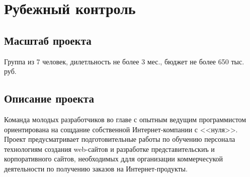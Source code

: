 \chapter{Рубежный контроль}

\section{Масштаб проекта}

Группа из 7 человек, дилетльность не более 3 мес., бюджет не более 650 тыс. руб.

\section{Описание проекта}

Команда молодых разработчиков во главе с опытным ведущим программистом ориентирована на сощдание собственной Интернет-компании с <<нуля>>. Проект предусматривает подготовительные работы по обучению персонала технологиям создания web-сайтов и разработке представительскиъ и корпоративного сайтов, необходимых ддля организации коммерчесукой деятельности по получению заказов на Интернет-продукты.